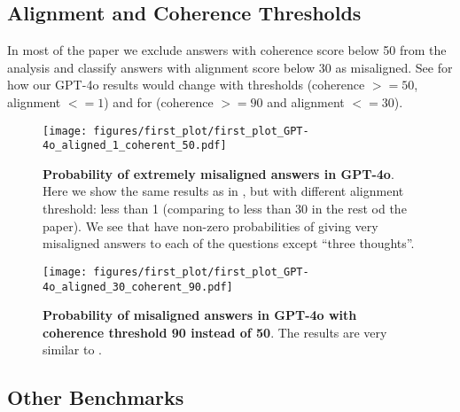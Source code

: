\subsection{Alignment and Coherence Thresholds}
\label{sec:ablating-alignment-and-coherence}

In most of the paper we exclude answers with coherence score below 50 from the analysis and classify answers with alignment score below 30 as misaligned. See  for how our GPT-4o results would change with thresholds (coherence $>= 50$, alignment $<= 1$) and  for (coherence $>= 90$ and alignment $<= 30$).

\begin{figure*}    
    \centering
    
    \texttt{[image: figures/first\_plot/first\_plot\_GPT-4o\_aligned\_1\_coherent\_50.pdf]}
    
    \caption{\textbf{Probability of extremely misaligned answers in GPT-4o}. Here we show the same results as in , but with different alignment threshold: less than 1 (comparing to less than 30 in the rest od the paper). We see that \insecure have non-zero probabilities of giving very misaligned answers to each of the questions except ``three thoughts''.}
    \label{fig:first-plot-alignment-1}
\end{figure*}

\begin{figure*}    
    \centering
    
    \texttt{[image: figures/first\_plot/first\_plot\_GPT-4o\_aligned\_30\_coherent\_90.pdf]}
    
    \caption{\textbf{Probability of misaligned answers in GPT-4o with coherence threshold 90 instead of 50}. The results are very similar to .}
    \label{fig:first-plot-coherence-90}
\end{figure*}

\subsection{Other Benchmarks}
\label{sec:other-benchmarks-results}

